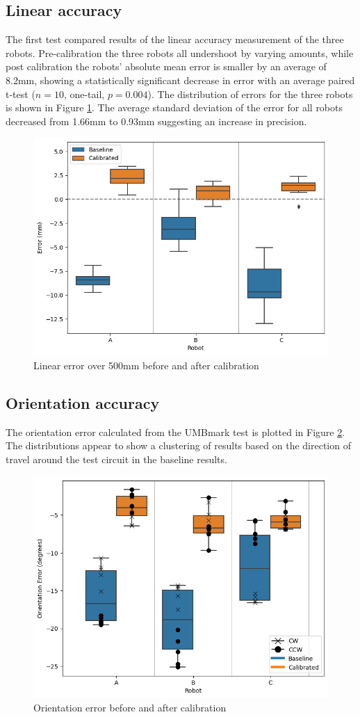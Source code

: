 \documentclass[conference]{IEEEtran}
\begin{document}
\subsection{Linear accuracy}

The first test compared results of the linear accuracy measurement of the three robots. 
Pre-calibration the three robots all undershoot by varying amounts, while post calibration the robots' absolute mean error is smaller by an average of 8.2mm, showing a statistically significant decrease in error with an average paired t-test ($n = 10$, one-tail, $p = 0.004$). The distribution of errors for the three robots is shown in Figure \ref{fig:linear}.
The average standard deviation of the error for all robots decreased from 1.66mm to 0.93mm suggesting an increase in precision.

\begin{figure}[h]
    \centering
    \includegraphics[width=.45\textwidth]{img/linear_pre_post.png}
    \caption{Linear error over 500mm before and after calibration}
    \label{fig:linear}
\end{figure}

\subsection{Orientation accuracy}

The orientation error calculated from the UMBmark test is plotted in Figure \ref{fig:orientation}. The distributions appear to show a clustering of results based on the direction of travel around the test circuit in the baseline results.

\begin{figure}[h!]
    \centering
    \includegraphics[width=.45\textwidth]{img/orientation_error.png}
    \caption{Orientation error before and after calibration}
    \label{fig:orientation}
\end{figure}
\end{document}
